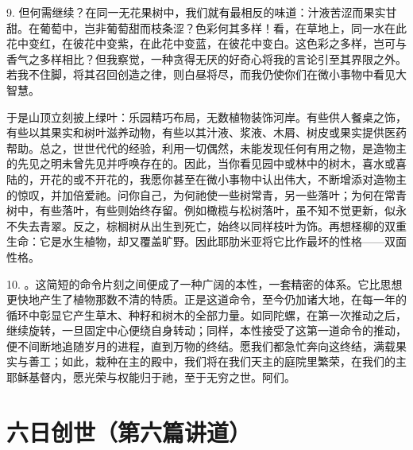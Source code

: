 9. 但何需继续？在同一无花果树中，我们就有最相反的味道：汁液苦涩而果实甘甜。在葡萄中，岂非葡萄甜而枝条涩？色彩何其多样！看，在草地上，同一水在此花中变红，在彼花中变紫，在此花中变蓝，在彼花中变白。这色彩之多样，岂可与香气之多样相比？但我察觉，一种贪得无厌的好奇心将我的言论引至其界限之外。若我不住脚，将其召回创造之律，则白昼将尽，而我仍使你们在微小事物中看见大智慧。\par

 于是山顶立刻披上绿叶：乐园精巧布局，无数植物装饰河岸。有些供人餐桌之饰，有些以其果实和树叶滋养动物，有些以其汁液、浆液、木屑、树皮或果实提供医药帮助。总之，世世代代的经验，利用一切偶然，未能发现任何有用之物，是造物主的先见之明未曾先见并呼唤存在的。因此，当你看见园中或林中的树木，喜水或喜陆的，开花的或不开花的，我愿你甚至在微小事物中认出伟大，不断增添对造物主的惊叹，并加倍爱祂。问你自己，为何祂使一些树常青，另一些落叶；为何在常青树中，有些落叶，有些则始终存留。例如橄榄与松树落叶，虽不知不觉更新，似永不失去青翠。反之，棕榈树从出生到死亡，始终以同样枝叶为饰。再想柽柳的双重生命：它是水生植物，却又覆盖旷野。因此耶肋米亚将它比作最坏的性格——双面性格。\par

10. 。这简短的命令片刻之间便成了一种广阔的本性，一套精密的体系。它比思想更快地产生了植物那数不清的特质。正是这道命令，至今仍加诸大地，在每一年的循环中彰显它产生草木、种籽和树木的全部力量。如同陀螺，在第一次推动之后，继续旋转，一旦固定中心便绕自身转动；同样，本性接受了这第一道命令的推动，便不间断地追随岁月的进程，直到万物的终结。愿我们都急忙奔向这终结，满载果实与善工；如此，栽种在主的殿中，我们将在我们天主的庭院里繁荣，在我们的主耶稣基督内，愿光荣与权能归于祂，至于无穷之世。阿们。\par



\section{六日创世（第六篇讲道）}

\par

